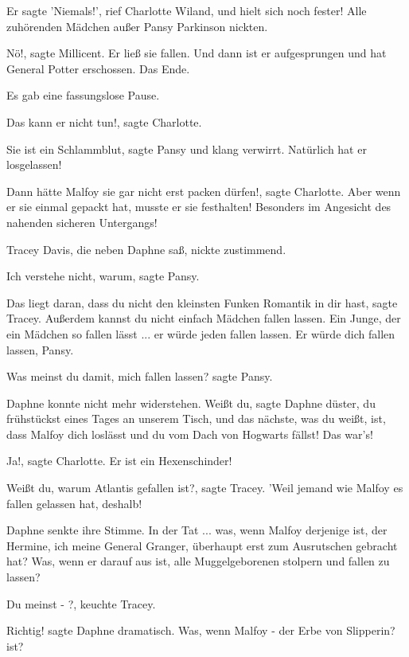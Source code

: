 \glqq{}Er sagte 'Niemals!'\grqq{}, rief Charlotte Wiland, \glqq{}und hielt sich
noch fester! Alle zuhörenden Mädchen außer Pansy Parkinson nickten.\grqq{}

Nö!\grqq{}, sagte Millicent. \glqq{}Er ließ sie fallen. Und dann ist er
aufgesprungen und hat General Potter erschossen. Das Ende.\grqq{}

Es gab eine fassungslose Pause.

\glqq{}Das kann er nicht tun!\grqq{}, sagte Charlotte.

\glqq{}Sie ist ein Schlammblut\grqq{}, sagte Pansy und klang verwirrt. \glqq{}
Natürlich hat er losgelassen!\grqq{}

\glqq{}Dann hätte Malfoy sie gar nicht erst packen dürfen!\grqq{}, sagte
Charlotte. \glqq{}Aber wenn er sie einmal gepackt hat, musste er sie festhalten!
Besonders im Angesicht des nahenden sicheren Untergangs!\grqq{}

Tracey Davis, die neben Daphne saß, nickte zustimmend.

\glqq{}Ich verstehe nicht, warum\grqq{}, sagte Pansy.

\glqq{}Das liegt daran, dass du nicht den kleinsten Funken Romantik in dir
hast\grqq{}, sagte Tracey. \glqq{}Außerdem kannst du nicht einfach Mädchen fallen
lassen. Ein Junge, der ein Mädchen so fallen lässt ... er würde jeden fallen
lassen. Er würde dich fallen lassen, Pansy.\grqq{}

\glqq{}Was meinst du damit, mich fallen lassen?\grqq{} sagte Pansy.

Daphne konnte nicht mehr widerstehen. \glqq{}Weißt du\grqq{}, sagte Daphne
düster, \glqq{}du frühstückst eines Tages an unserem Tisch, und das nächste, was
du weißt, ist, dass Malfoy dich loslässt und du vom Dach von Hogwarts fällst!
Das war's!\grqq{}

\glqq{}Ja!\grqq{}, sagte Charlotte. \glqq{}Er ist ein Hexenschinder!\grqq{}

\glqq{}Weißt du, warum Atlantis gefallen ist?\grqq{}, sagte Tracey. \glqq{}'Weil
jemand wie Malfoy es fallen gelassen hat, deshalb!\grqq{}

Daphne senkte ihre Stimme. \glqq{}In der Tat ... was, wenn Malfoy derjenige ist,
der Hermine, ich meine General Granger, überhaupt erst zum Ausrutschen gebracht
hat? Was, wenn er darauf aus ist, alle Muggelgeborenen stolpern und fallen zu
lassen?\grqq{}

\glqq{}Du meinst - ?\grqq{}, keuchte Tracey.

\glqq{}Richtig!\grqq{} sagte Daphne dramatisch. \glqq{}Was, wenn Malfoy - der Erbe
von Slipperin? ist?\grqq{}

